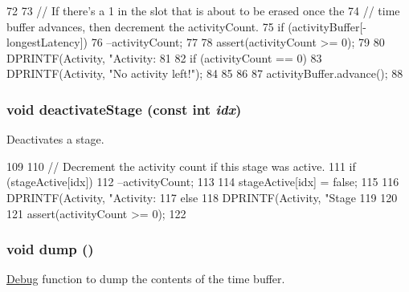 \begin{DoxyCode}
72 {
73     // If there's a 1 in the slot that is about to be erased once the
74     // time buffer advances, then decrement the activityCount.
75     if (activityBuffer[-longestLatency]) {
76         --activityCount;
77 
78         assert(activityCount >= 0);
79 
80         DPRINTF(Activity, "Activity: %
81 
82         if (activityCount == 0) {
83             DPRINTF(Activity, "No activity left!\n");
84         }
85     }
86 
87     activityBuffer.advance();
88 }
\end{DoxyCode}
\hypertarget{classActivityRecorder_a4d73bea02eaf6f93e267391592556fe7}{
\subsubsection[{deactivateStage}]{\setlength{\rightskip}{0pt plus 5cm}void deactivateStage (const int {\em idx})}}
\label{classActivityRecorder_a4d73bea02eaf6f93e267391592556fe7}
Deactivates a stage. 


\begin{DoxyCode}
109 {
110     // Decrement the activity count if this stage was active.
111     if (stageActive[idx]) {
112         --activityCount;
113 
114         stageActive[idx] = false;
115 
116         DPRINTF(Activity, "Activity: %
117     } else {
118         DPRINTF(Activity, "Stage %
119     }
120 
121     assert(activityCount >= 0);
122 }
\end{DoxyCode}
\hypertarget{classActivityRecorder_accd2600060dbaee3a3b41aed4034c63c}{
\subsubsection[{dump}]{\setlength{\rightskip}{0pt plus 5cm}void dump ()}}
\label{classActivityRecorder_accd2600060dbaee3a3b41aed4034c63c}
\hyperlink{namespaceDebug}{Debug} function to dump the contents of the time buffer. 


